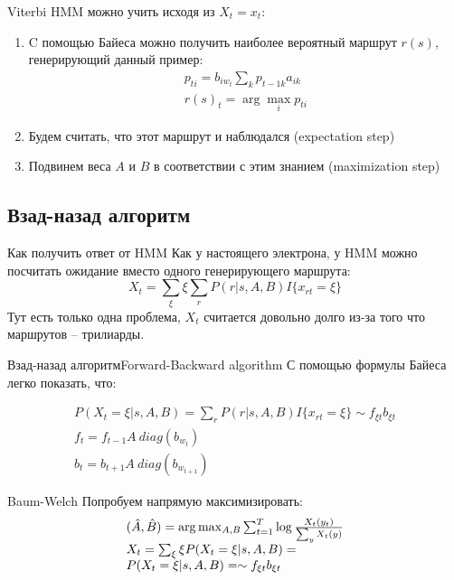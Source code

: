 \documentclass[14pt, fleqn, xcolor={dvipsnames, table}]{beamer}
\begin{document}
\begin{frame}{Viterbi}
HMM можно учить исходя из $X_t = x_t$:
\begin{enumerate}
  \item  C помощью Байеса можно получить наиболее вероятный маршрут $r(s)$, генерирующий данный пример:
$$\begin{array}{l}
p_{ti} = b_{iw_t} \sum_k p_{{t - 1}k} a_{ik} \\
r(s)_t = \arg \max_i p_{ti}
\end{array}$$
  \item Будем считать, что этот маршрут и наблюдался (expectation step)
  \item Подвинем веса $A$ и $B$ в соответствии с этим знанием (maximization step)
\end{enumerate}
\end{frame}

\subsection{Взад-назад алгоритм}

\begin{frame}{Как получить ответ от HMM}
Как у настоящего электрона, у HMM можно посчитать ожидание вместо одного генерирующего маршрута:
$$
X_t = \sum_\xi \xi \sum_r P(r|s,A,B) I\{x_{rt} = \xi\}
$$
Тут есть только одна проблема, $X_t$ считается довольно долго из-за того что маршрутов -- трилиарды.
\end{frame}

\begin{frame}{Взад-назад алгоритм}{Forward-Backward algorithm}
С помощью формулы Байеса легко показать, что:

$$\begin{array}{l}
P(X_t = \xi| s, A, B) = \sum_r P(r|s,A,B) I\{x_{rt} = \xi\} \sim f_{\xi t} b_{\xi t} \\
f_{t}  = f_{t-1} A\ diag(b_{w_t}) \\
b_{t}  = b_{t+1} A\ diag(b_{w_{t+1}})
\end{array}$$
\end{frame}


\begin{frame}{Baum-Welch}
Попробуем напрямую максимизировать:
$$\begin{array}{l}
(\hat{A}, \hat{B}) = \arg \max_{A,B} \sum_{t=1}^{T} \log {X_t(y_t) \over \sum_y X_t(y)} \\
X_t = \sum_\xi \xi P(X_t = \xi| s, A, B) = \\
P(X_t = \xi| s, A, B) = \sim f_{\xi t} b_{\xi t} \\
\end{array}$$
\small
{}
\end{frame}
\end{document}
